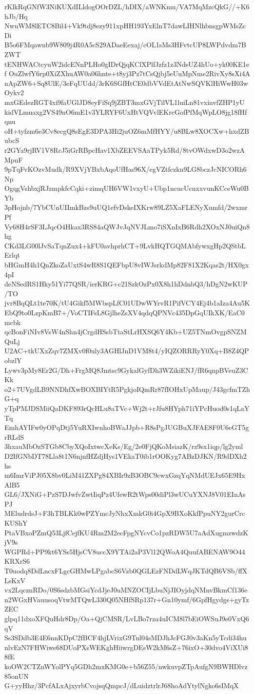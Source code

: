 rKlkRqGNfW3NiKUXdILldogOOrDZL/hDIX/aWNKnm/VA7MqMzcQkG//+K6hJb/Hq
NwuWM8lETC8Bil4+Vk9tdj8ezy911xpHH193YxElnT7dawLIHNlhbnsgpWMsZcDi
B5o6FMqawnb9W809j4R0A5cS29ADaeEexaj/cOL1sMs3HFvtcUP8LWPdvdm7BZWT
tENHWACtcyuW2idcENnPLHo0gIDrQjqKClXPlfJzfz1z3NdsUZ4hUo+yk00KE1ef
OuZlwfY6rp0XiZXhuAW0a06hnte+t8yj3Pz7tCsQjbj5eUuMpNme2RivXy8sXi4A
nApZW6+Sq8UlE/3eFqUUdd/3rK6SGfHtCE0dbVVdEtAtNwSQVKlHiWwH03wOykv2
mxGEdezRGT4xi9faUGlJD8eyFiSq9jZBT3mxGVjTilVL1luiLn81vxinvfZHP1yU
kidVLmuaxg2VS49nO6mE1v3YLRYF6UxHtVQVvlEKrcGofPfMqWpLO8jg18fHfqnu
oH+tyfzm6e3Cv8ecgQ8sEgE3DPA3Hi2juOZ6mMfHYY/u8BLw8XOCXw+hxdZBubcS
r2GYa9rjRV1V8RcJ5iGrRBpcHav1XbZEEVSAaTPyk5Rd/8tvOWdxwD3o2wzAMpuF
9pTqFvKOzvMudk/R9XVjYBxbAqoUfHas96X/egVZtfczkn9LG8bczJcNICORh6Np
OgqgVshbxjRJzmpkfcCqki+zimqUH6VW1vxyU+Ubp1ncucUcnxxvunKCceWu0BYb
3pHojnb/7YbCUnUIImkBzs9uUQ1efvDskeIXKrw89LZ5XaFLENyXumfd/2wxmrPf
Vy68H4rSF3LJqcO4Hkax3RS84aQWJvJqNVJLmo7iSXnIxB6Rdh2XOxNJ0uiQn8hg
CKd3LG00lJvSaTqnZux4+kFU0avhprhCT+9LvkHQTGQMAbfywxgHp2QStbLErlqt
bHGmH4h1QnZkoZaUxtS4wR8S1QEFbpU8vIWJsrkdMp82F81X2Kqas2t/HX0gx4pI
deNSedRS1Hky51Yi77QSR/ierKRG+c21SzkOzPx0X8h1hDdnbQ3/hDgN2wKUP/TO
jvr8BqQLt1te70K/tU4Gikf5MWbspLfC01UDwWYrvR1PifVCY4Ej4b1aIza4Au5K
EbQ9to0LzpKmB7+/VoCTIFsL8GjlheZsXV4qdqQPNVc435DpGqUIkXK/EaC0mcbk
qcBonFiNIv8VsW4nShn4jCrgdHSsbTtaStLrHXSQ6Y4Kb+UZ5TNmOvgpSNZMQuLj
U2AC+tkUXxZqv7ZMXv0f0uly3AGHlJnD1VM8t4/yIQZORRRyY0Xq+B8Z4QPobzlY
Lywv3pMy8Er2G/Dh+FrgMQ8Jmtsc9GykalGyfDh3WZikiENJ/fR6qnpBVeuZ3CKk
o2+7UVgdLB9NNDhfXwBOXBIYtR5PgkjoIQmRr87fIOHxUpMaup/J43gcfmTZhG+q
yTpPMJDSMiiQaDKF893rQcHLu8aTVc+Wj2t+rJfu8HYph71iYPcHuod0s1qLaYTq
EmhAYIFw0yOPqDtj5YuRXIwnhoBWaJJpb+R8sPgJUGBuXJFAE8F0U6eGT5grRLdS
3hxauMbOzSTGb8CbyXQoIxtwcXeKs/Eg/2e0FjQKoMsiazK/rz9sx1iqp/lg2yml
D2IfGNbDT78Lla8t1N6njnfHZdjHys1VEkaT0ib1rOOKyg7ABzDJKN/R9dDXh2hs
m6ImrViPJ05X8bv0LiM41ZXPg84XBIr9zB3OBC9cwxGzqYqNMdUEJx65E9HxAlB5
GL6/JXNiG+PzS7DJwfvZwtIiqPz4UfewR2tWps00diPl3wUCuYXNJ8V01EInAsPJ
MEludrdsJ+F3hTBLKk0wPZYmcJyNhxXmkG0i4GpX9BXoKkfPpuNY2gurCrcKUShY
PtaVBxoPZmQ53LjfCejfKU4Rm2M2ecFpgNYcvCo1pzRDW5U7aAdXugmzwdzKjV9s
WGPRd+PP9kt6YSs5HjsCV8uccX9YTAi2aP3Vl12QWoA4QuufABENAW9O44KRXrS6
T0uodq8DdLncxFLgcGHMwLPgabcS6Vzb0QGLEzFNDdLWqJKTdQB6VSb/ffXLsKxV
vx2LqcznRDo/0S6sdzbMGsiYcdJjeJ0uMNZOCIjLbuNjJIOyjdqNMnvBkmCf136e
n2WGxHVauusoqVtwMTQwL330Q05NHfSRp137r+Gn10ymf/6GpfHgydgs+gyTzZEC
glpq11dxoXFQuHdr8Dp/Oa+QjCMSR/LvLBo7rza4uICM8l7bEiOWSuJ9e0VxQ6qV
Ss3SDdb3E4E6nnKDpC2fBCF4hjLVrixG9Tnl04sMDJhJcFGJ0v3aKn5yTcdi34hu
nlvEzN7FHWiwe68DUoPXsWEKghHiiwrgDEsW2kM6sZ+76ixO+30dvo4ViXUi88fE
koOW2CTZnWYolPYq5GDh2mxKMG0e+b56Z55/nwkuvpZTpAufgN9BWHDlvz85onUN
G+yyHhz/3PcfALxAjxyrbCvojsqQmpcJ/dLuidztrlrJ68hoAdYtylNgko6sIMqX
